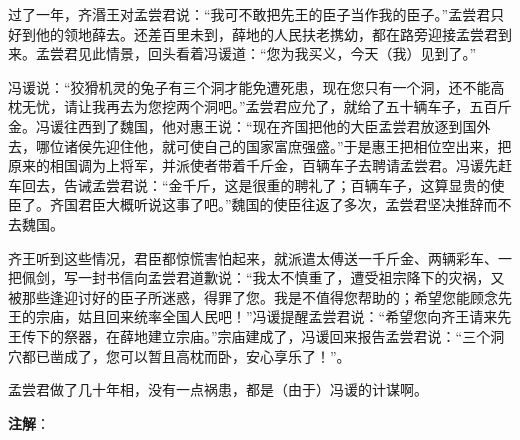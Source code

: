 \documentclass[12pt,UTF-8,openany,a4]{ctexbook}
\begin{document}
\begin{large}
    过了一年，齐湣王对孟尝君说：“我可不敢把先王的臣子当作我的臣子。”孟尝君只好到他的领地薛去。还差百里未到，薛地的人民扶老携幼，都在路旁迎接孟尝君到来。孟尝君见此情景，回头看着冯谖道：“您为我买义，今天（我）见到了。”
    
    冯谖说：“狡猾机灵的兔子有三个洞才能免遭死患，现在您只有一个洞，还不能高枕无忧，请让我再去为您挖两个洞吧。”孟尝君应允了，就给了五十辆车子，五百斤金。冯谖往西到了魏国，他对惠王说：“现在齐国把他的大臣孟尝君放逐到国外去，哪位诸侯先迎住他，就可使自己的国家富庶强盛。”于是惠王把相位空出来，把原来的相国调为上将军，并派使者带着千斤金，百辆车子去聘请孟尝君。冯谖先赶车回去，告诫孟尝君说：“金千斤，这是很重的聘礼了；百辆车子，这算显贵的使臣了。齐国君臣大概听说这事了吧。”魏国的使臣往返了多次，孟尝君坚决推辞而不去魏国。
    
    齐王听到这些情况，君臣都惊慌害怕起来，就派遣太傅送一千斤金、两辆彩车、一把佩剑，写一封书信向孟尝君道歉说：“我太不慎重了，遭受祖宗降下的灾祸，又被那些逢迎讨好的臣子所迷惑，得罪了您。我是不值得您帮助的；希望您能顾念先王的宗庙，姑且回来统率全国人民吧！”冯谖提醒孟尝君说：“希望您向齐王请来先王传下的祭器，在薛地建立宗庙。”宗庙建成了，冯谖回来报告孟尝君说：“三个洞穴都已凿成了，您可以暂且高枕而卧，安心享乐了！”。
    
    孟尝君做了几十年相，没有一点祸患，都是（由于）冯谖的计谋啊。
    

\end{large}


\newpage

\begin{Large}
   \noindent \textbf{注解}：
\end{Large}

\vspace{-1em}
\end{document}
